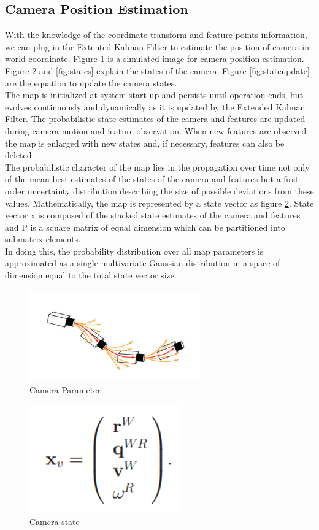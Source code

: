 \documentclass[10pt, conference, compsocconf]{IEEEtran}
\begin{document}
\subsection{Camera Position Estimation}
With the knowledge of the coordinate transform and feature points information, we can plug in the Extented Kalman Filter to estimate the position of camera in world coordinate. Figure \ref{fig:cameraMotion} is a simulated image for camera position estimation. Figure \ref{fig:state} and \ref{fig:states} explain the states of the camera. Figure \ref{fig:stateupdate} are the equation to update the camera states. \\
The map is initialized at system start-up and persists until operation ends, but evolves continuously and dynamically as it is updated by the Extended Kalman Filter. The probabilistic state estimates of the camera and features are updated during camera motion and feature observation. When new features are observed the map is enlarged with new states and, if necessary, features can also be deleted.\\
The probabilistic character of the map lies in the propagation over time not only of the mean best estimates of the states of the camera and features but a first order uncertainty distribution describing the size of possible deviations from these values. Mathematically, the map is represented by a state vector as figure \ref{fig:state}.  State vector x is composed of the stacked state estimates of the camera and features and P is a square matrix of equal dimension which can be partitioned into submatrix elements. \\
In doing this, the probability distribution over all map parameters is approximated as a single multivariate Gaussian distribution in a space of dimension equal to the total state vector size.
\begin{figure}[H]
	\centering
	\includegraphics[scale = 0.60]{image/cameraMotion.png}
	\caption{Camera Parameter}
	\label{fig:cameraMotion}
\end{figure}

\begin{figure}[H]
	\centering
	\includegraphics[scale = 0.60]{image/state.png}
	\caption{Camera state}
	\label{fig:state}
\end{figure}
\end{document}
